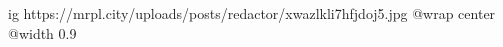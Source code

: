  
 
 
 
 

\ifcmt
  ig https://mrpl.city/uploads/posts/redactor/xwazlkli7hfjdoj5.jpg
  @wrap center
  @width 0.9
\fi
